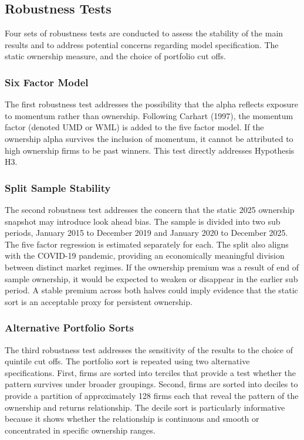 \subsection{Robustness Tests}

Four sets of robustness tests are conducted to assess the stability of the main results and to address potential concerns regarding model specification. The static ownership measure, and the choice of portfolio cut offs.


\subsubsection{Six Factor Model}

The first robustness test addresses the possibility that the alpha reflects exposure to momentum rather than ownership. Following Carhart (1997), the momentum factor (denoted UMD or WML) is added to the five factor model. If the ownership alpha survives the inclusion of momentum, it cannot be attributed to high ownership firms to be past winners. This test directly addresses Hypothesis H3.


\subsubsection{Split Sample Stability}

The second robustness test addresses the concern that the static 2025 ownership snapshot may introduce look ahead bias. The sample is divided into two sub periods, January 2015 to December 2019 and January 2020 to December 2025. The five factor regression is estimated separately for each. The split also aligns with the COVID-19 pandemic, providing an economically meaningful division between distinct market regimes. If the ownership premium was a result of end of sample ownership, it would be expected to weaken or disappear in the earlier sub period. A stable premium across both halves could imply evidence that the static sort is an acceptable proxy for persistent ownership.


\subsubsection{Alternative Portfolio Sorts}

The third robustness test addresses the sensitivity of the results to the choice of quintile cut offs. The portfolio sort is repeated using two alternative specifications. First, firms are sorted into terciles that provide a test whether the pattern survives under broader groupings. Second, firms are sorted into deciles to provide a partition of approximately 128 firms each that reveal the pattern of the ownership and returns relationship. The decile sort is particularly informative because it shows whether the relationship is continuous and smooth or concentrated in specific ownership ranges.


